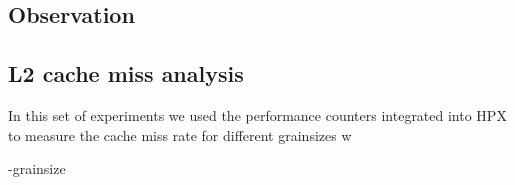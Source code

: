\subsection{Observation}

\subsection{L2 cache miss analysis}
In this set of experiments we used the performance counters integrated into HPX to measure the cache miss rate for different grain\textunderscore sizes w

-grain\textunderscore size
